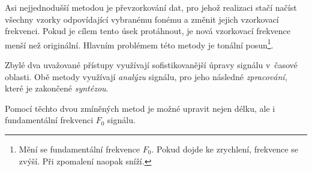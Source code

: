\noindent Asi nejjednodušší metodou je převzorkování dat, pro jehož realizaci stačí načíst všechny vzorky odpovídající vybranému fonému a změnit jejich vzorkovací frekvenci.
Pokud je cílem tento úsek protáhnout, je nová vzorkovací frekvence menší než originální.
Hlavním problémem této metody je tonální posun\footnote{Mění se fundamentální frekvence $F_0$. Pokud dojde ke zrychlení, frekvence se zvýší. Při zpomalení naopak sníží.}.

Zbylé dva uvažované přístupy využívají sofistikovanější úpravy signálu v~časové oblasti.
Obě metody využívají \textit{analýzu} signálu, pro jeho následné \textit{zpracování}, které je zakončené \textit{syntézou}.


Pomocí těchto dvou zmíněných metod je možné upravit nejen délku, ale i  fundamentální frekvenci $F_0$ signálu.

